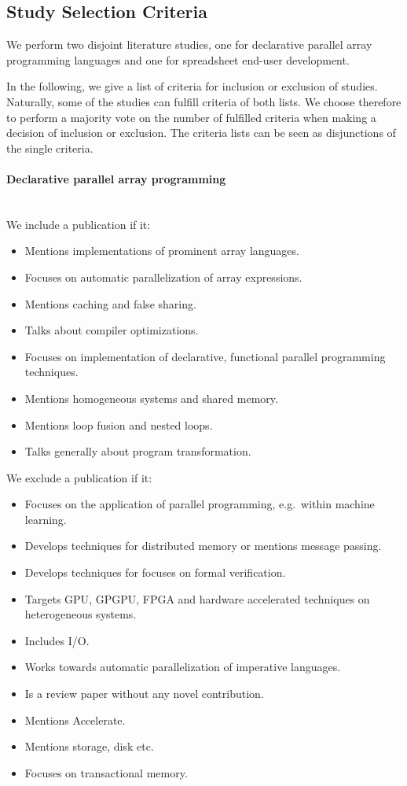 \documentclass[a4paper]{article}
\begin{document}
\subsection{Study Selection Criteria}
\label{sec:study-select-crit}

We perform two disjoint literature studies, one for declarative
parallel array programming languages and one for spreadsheet end-user
development.

In the following, we give a list of criteria for inclusion or
exclusion of studies. Naturally, some of the studies can fulfill
criteria of both lists. We choose therefore to perform a majority vote
on the number of fulfilled criteria when making a decision of
inclusion or exclusion. The criteria lists can be seen as disjunctions
of the single criteria.

\paragraph{Declarative parallel array programming}
~\\

We include a publication if it:

\begin{itemize}
\item Mentions implementations of prominent array languages.
\item Focuses on automatic parallelization of array expressions.
\item Mentions caching and false sharing.
\item Talks about compiler optimizations.
\item Focuses on implementation of declarative, functional parallel
  programming techniques.
\item Mentions homogeneous systems and shared memory.
\item Mentions loop fusion and nested loops.
\item Talks generally about program transformation.
\end{itemize}

We exclude a publication if it:

\begin{itemize}
\item Focuses on the application of parallel programming, e.g.\ within
  machine learning.
\item Develops techniques for distributed memory or mentions message
  passing.
\item Develops techniques for focuses on formal verification.
\item Targets GPU, GPGPU, FPGA and hardware accelerated techniques on
  heterogeneous systems.
\item Includes I/O.
\item Works towards automatic parallelization of imperative languages.
\item Is a review paper without any novel contribution.
\item Mentions Accelerate.
\item Mentions storage, disk etc.
\item Focuses on transactional memory.
\end{itemize}
\end{document}
